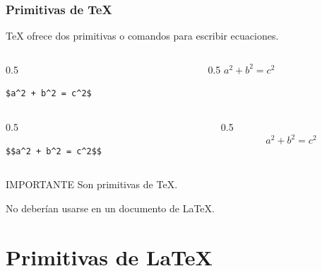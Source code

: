 \documentclass[12pt,aspectratio=169,ignorenonframetext]{ltxbeamer}
\begin{document}
\begin{frame}[fragile]
\frametitle{Primitivas de {\lmr\TeX}}

{\lmr\TeX} ofrece dos primitivas o comandos para escribir ecuaciones.

\pause\medskip

\begin{columns}
    \begin{column}{0.5\textwidth}
        \begin{verbatim}
$a^2 + b^2 = c^2$
        \end{verbatim}
    \end{column}
    {\color{gray} \vline}
    \begin{column}{0.5\textwidth}
        $a^2 + b^2 = c^2$
    \end{column}
\end{columns}

\pause\medskip

\begin{columns}
    \begin{column}{0.5\textwidth}
        \begin{verbatim}
$$a^2 + b^2 = c^2$$
        \end{verbatim}
    \end{column}
    {\color{gray} \vline}
    \begin{column}{0.5\textwidth}
        $$a^2 + b^2 = c^2$$
    \end{column}
\end{columns}

\pause\bigskip

\begin{alertblock}{IMPORTANTE}
    Son primitivas de {\lmr\TeX}.

    No deberían usarse en un documento de {\lmr\LaTeX}.
\end{alertblock}
\end{frame}





\section{Primitivas de {\lmr\LaTeX}}
\end{document}
